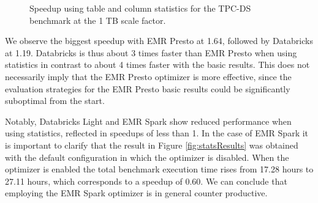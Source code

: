 \begin{figure}
   \begin{center}
   \end{center}
   \caption{Speedup using table and column statistics for the TPC-DS benchmark at the 1 TB scale factor.}
   \label{fig:statsSpeedup}
\end{figure}

We observe the biggest speedup with EMR Presto at 1.64, followed by Databricks at 1.19. Databricks is thus about 3 times faster than EMR Presto when using statistics in contrast to about 4 times faster with the basic results. This does not necessarily imply that the EMR Presto optimizer is more effective, since the evaluation strategies for the EMR Presto basic results could be significantly suboptimal from the start.

Notably, Databricks Light and EMR Spark show reduced performance when using statistics, reflected in speedups of less than 1. In the case of EMR Spark it is important to clarify that the result in Figure \ref{fig:statsResults} was obtained with the default configuration in which the optimizer is disabled. When the optimizer is enabled the total benchmark execution time rises from 17.28 hours to 27.11 hours, which corresponds to a speedup of 0.60. We can conclude that employing the EMR Spark optimizer is in general counter productive.








